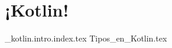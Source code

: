 \chapter{¡Kotlin!}
  \begin{refsection}
    {_kotlin.intro.index.tex}
    {Tipos_en_Kotlin.tex}
    \printbibliography
  \end{refsection}
